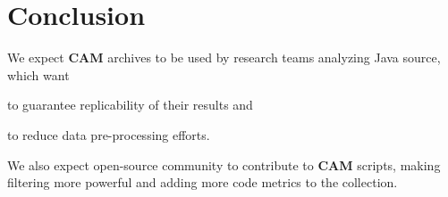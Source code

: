 \documentclass[11pt,sigplan,nonacm]{acmart}
\newcommand\cam{{\sffamily\bfseries CAM}}
\begin{document}
\section{Conclusion}

We expect \cam{} archives to be used by research teams analyzing Java source, which want
\begin{inparaenum}[(a)]
\item to guarantee replicability of their results
and
\item to reduce data pre-processing efforts.
\end{inparaenum}
We also expect open-source community to contribute to \cam{} scripts, making filtering more powerful and adding more code metrics to the collection.

{\raggedright

}
\end{document}
